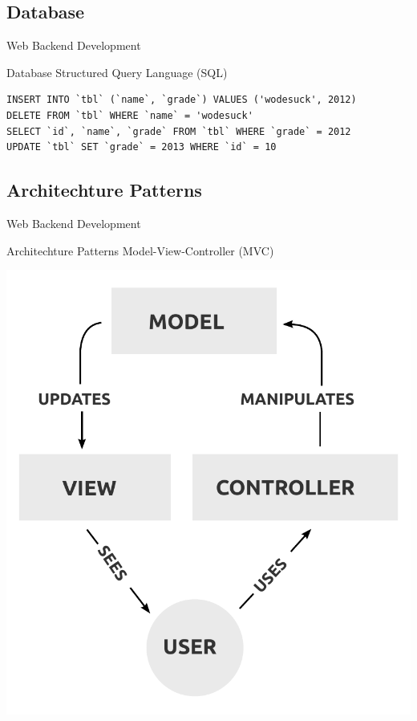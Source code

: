 \documentclass{beamer}
\begin{document}
\subsection{Database}
\begin{frame}[fragile]{Web Backend Development}
    \begin{block}{Database} \pause
        Structured Query Language (SQL)
        \begin{verbatim}
INSERT INTO `tbl` (`name`, `grade`) VALUES ('wodesuck', 2012)
DELETE FROM `tbl` WHERE `name` = 'wodesuck'
SELECT `id`, `name`, `grade` FROM `tbl` WHERE `grade` = 2012
UPDATE `tbl` SET `grade` = 2013 WHERE `id` = 10
        \end{verbatim}
    \end{block}
\end{frame}

\subsection{Architechture Patterns}
\begin{frame}{Web Backend Development}
    \begin{block}{Architechture Patterns} \pause
        Model-View-Controller (MVC)

        \center\includegraphics[scale=0.36]{MVC}\footnotemark
    \end{block}

\end{frame}
\end{document}
